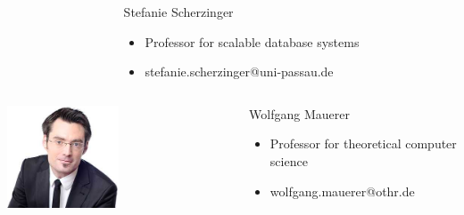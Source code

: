 \documentclass[9pt]{beamer}
\begin{document}
\begin{frame}
\begin{minipage}[c]{1.0\linewidth}
\begin{columns}
\begin{column}{0.35\textwidth}
\begin{center}
			\end{center}
		\end{column}
		\begin{column}{0.7\textwidth}
		\begin{block}{Stefanie Scherzinger}
			\begin{itemize}
				\item Professor for scalable database systems
				\item stefanie.scherzinger@uni-passau.de
			\end{itemize}
		\end{block}
		\end{column}
		\end{columns}
	\end{minipage}
	\begin{minipage}[c]{1.0\linewidth}
		\begin{columns}
		\begin{column}{0.35\textwidth}
			\begin{center}
     		\includegraphics[width=0.5\textwidth]{pics/speakers_mauerer.jpeg}
			\end{center}
		\end{column}
		\begin{column}{0.7\textwidth}
		\begin{block}{Wolfgang Mauerer}
			\begin{itemize}
				\item Professor for theoretical computer science
				\item wolfgang.mauerer@othr.de
			\end{itemize}
		\end{block}
		\end{column}
		\end{columns}

	\end{minipage}
	\end{frame}
\end{document}
